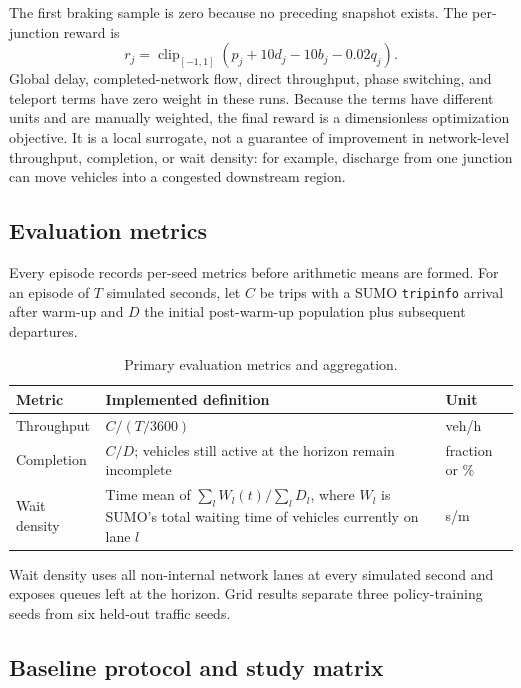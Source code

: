 \documentclass[10pt,a4paper]{article}
\newcommand{\reportcontentwidth}{0.82\linewidth}
\begin{document}
The first braking sample is zero because no preceding snapshot exists.
The per-junction reward is
\[
r_j=\operatorname{clip}_{[-1,1]}\!\left(p_j+10d_j-10b_j-0.02q_j\right).
\]
Global delay, completed-network flow, direct throughput, phase switching, and teleport terms have zero weight in these runs.
Because the terms have different units and are manually weighted, the final reward is a dimensionless optimization objective.
It is a local surrogate, not a guarantee of improvement in network-level throughput, completion, or wait density: for example, discharge from one junction can move vehicles into a congested downstream region.

\subsection{Evaluation metrics}

Every episode records per-seed metrics before arithmetic means are formed.
For an episode of \(T\) simulated seconds, let \(C\) be trips with a SUMO \texttt{tripinfo} arrival after warm-up and \(D\) the initial post-warm-up population plus subsequent departures.

\begin{table}[H]
  \footnotesize
  \centering
  \caption{Primary evaluation metrics and aggregation.}
  \begin{tabularx}{\reportcontentwidth}{@{}lXl@{}}
    \toprule
    Metric & Implemented definition & Unit\\
    \midrule
    Throughput & \(C/(T/3600)\) & veh/h\\
    Completion & \(C/D\); vehicles still active at the horizon remain incomplete & fraction or \%\\
    Wait density & Time mean of \(\sum_l W_l(t)/\sum_l D_l\), where \(W_l\) is SUMO's total waiting time of vehicles currently on lane \(l\) & s/m\\
    \bottomrule
  \end{tabularx}
  \label{tab:metrics}
\end{table}

Wait density uses all non-internal network lanes at every simulated second and exposes queues left at the horizon.
Grid results separate three policy-training seeds from six held-out traffic seeds.

\subsection{Baseline protocol and study matrix}
\end{document}
